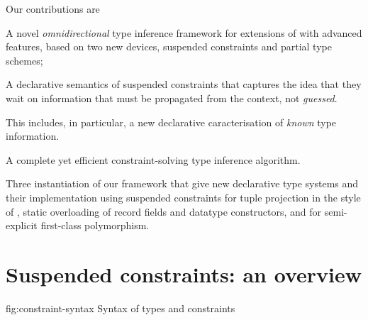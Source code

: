 \documentclass[acmsmall,screen,nonacm,review]{acmart}
\begin{document}
Our contributions are
\begin{enumerate*}
\item
  A novel \emph{omnidirectional} type inference framework for
  extensions of \ML with advanced features, based on two new devices,
  suspended constraints and partial type schemes;

\item A declarative semantics of suspended constraints that captures the
  idea that they wait on information that must be propagated from the
  context, not \emph{guessed}.

  This includes, in particular, a new declarative caracterisation of
  \emph{known} type information.

\item
  A complete yet efficient constraint-solving type inference algorithm.

\item
  Three instantiation of our framework that give new declarative type
  systems and their implementation using suspended constraints for tuple
  projection in the style of \SML, static overloading of record fields and
  datatype constructors, and for semi-explicit first-class polymorphism.

\end{enumerate*}

\section{Suspended constraints: an overview}
\label{sec:constraints}

\begin{bnffig}[t]%
  {fig:constraint-syntax}%
  {Syntax of types and constraints}
\\
\entry[Types]{\t}{
    \tv \and
    \tunit \and
    \ta \to \tb \color{gray} \and
    \Pi\iton \ti \and
    \T \tys \and
    \tpoly \ts
}\\
\\[1ex]
\entry[Constraints]{\c}{
        \ctrue
  \and  \cfalse
  \and  \ca \cand \cb
  \and  \cexists \tv \c
  \and 	\cfor \tv \c
  \and  \cunif \ta \tb
  \nextline
  \and  \clet \x \tv \ca \cb
  \and  \capp \x \t
  \nextline
  \and  \cmatch \t \cbrs
}\\[1ex]
\entry[Branches]{\cbr}{\cbranch \cpat \c} \\
\entry[Patterns]{\cpat}{}{} \\[1ex]
 \\
\entry[Shapes] {\Sh} {} {}
\\
 {} {}
\end{bnffig}
\end{document}
